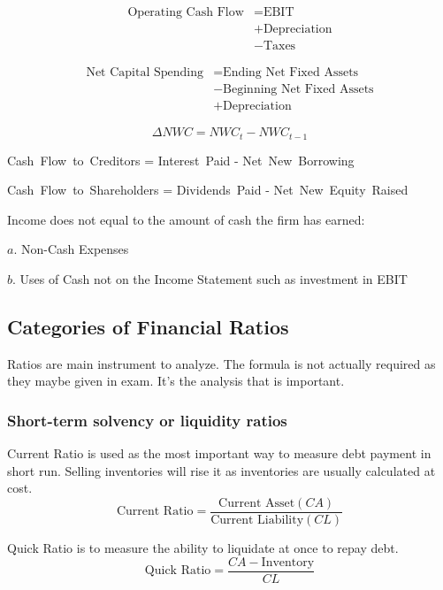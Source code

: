 \documentclass[10pt, a4paper]{article}
\begin{document}
        \begin{align*}
            \text{Operating Cash Flow} &= \text{EBIT} \\
                &+ \text{Depreciation}\\
                &- \text{Taxes}
        \end{align*}

        \begin{align*} \text{Net Capital Spending} &= \text{Ending\ Net\ Fixed\ Assets}\\
            &- \text{Beginning\ Net\ Fixed\ Assets}\\ 
            &+  \text{Depreciation}
        \end{align*}

        $$\Delta NWC = NWC_{t} - NWC_{t - 1}$$
        \begin{center}
        Cash\ Flow\ to\ Creditors = Interest\ Paid - Net\ New\ Borrowing

        Cash\ Flow\ to\ Shareholders = Dividends\ Paid - Net\ New\ Equity\ Raised
        \end{center}



        Income does not equal to the amount of cash the firm has earned:

            $a$. Non-Cash Expenses
        
            $b$. Uses of Cash not on the Income Statement such as investment in EBIT
    
    \subsection{Categories of Financial Ratios}
        Ratios are main instrument to analyze. The formula is not actually required as they maybe given in exam. It's the analysis that is important. 
        
        \subsubsection{Short-term solvency or liquidity ratios}

        Current Ratio is used as the most important way to measure debt payment in short run. Selling inventories will rise it as inventories are usually calculated at cost. 
        $$\text{Current\ Ratio} = \frac{\text{Current\ Asset}(CA)}{\text{Current\ Liability}(CL)}$$

        Quick Ratio is to measure the ability to liquidate at once to repay debt.
        $$\text{Quick\ Ratio} = \frac{CA - \text{Inventory}}{CL}$$
        
\end{document}
